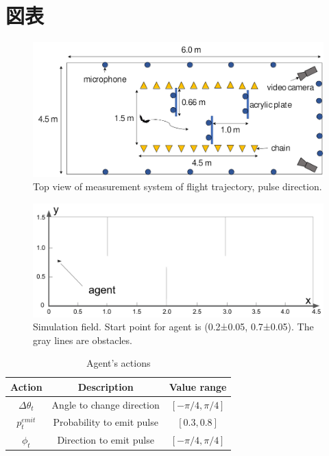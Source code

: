 \documentclass[../main]{subfiles}
\begin{document}
\newpage
\chapter*{図表}

\renewcommand{\figurename}{Fig. } %
\renewcommand{\tablename}{Table } %


\begin{figure}[H]
  \centering
  \includegraphics[width=12cm]{figures/top_view_measure.png}
  \caption{
    Top view of measurement system of flight trajectory,
    pulse direction.
  }\label{fig:top_view_measure}
\end{figure}

\newpage
{}
\begin{figure}[H]
  \centering
  \vfill
  \includegraphics[width=14cm]{figures/simulation_field.png}
  \caption{
    Simulation field.
    Start point for agent is (0.2±0.05, 0.7±0.05).
    The gray lines are obstacles.
  }\label{fig:simulation_field}
\end{figure}


\newpage
{}
\begin{table}[H]
  \caption{Agent's actions}\label{tab:agent_actions}
  \centering
    \begin{tabular}{c|c|c}
      Action & Description & Value range \\ \hline
      $\Delta\theta_t$ & Angle to change direction & $[-\pi/4, \pi/4]$ \\
      $p^{emit}_t$ & Probability to emit pulse & $[0.3, 0.8]$ \\
      $\phi_t$ & Direction to emit pulse & $[-\pi/4, \pi/4]$ \\
    \end{tabular}
\end{table}
\end{document}
